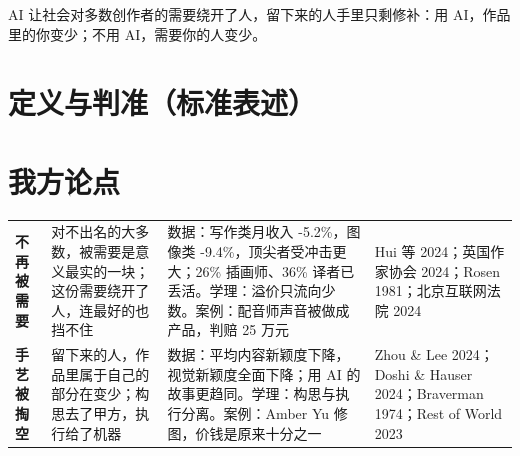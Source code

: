 \documentclass[quick,con]{debate}
\begin{document}
\debatetitle
\begin{thesisbox}AI 让社会对多数创作者的需要绕开了人，留下来的人手里只剩修补：用 AI，作品里的你变少；不用 AI，需要你的人变少。\end{thesisbox}

\section{定义与判准（标准表述）}
\begin{fields}
\end{fields}

\section{我方论点}
\begin{tabularx}{\linewidth}{@{}L{5em}Y Y L{6.4em}@{}}\toprule
{}&&&\\\midrule
\textbf{不再被需要}&对不出名的大多数，被需要是意义最实的一块；这份需要绕开了人，连最好的也挡不住&数据：写作类月收入 -5.2\%，图像类 -9.4\%，顶尖者受冲击更大；26\% 插画师、36\% 译者已丢活。学理：溢价只流向少数。案例：配音师声音被做成产品，判赔 25 万元&Hui 等 2024；英国作家协会 2024；Rosen 1981；北京互联网法院 2024\\
\textbf{手艺被掏空}&留下来的人，作品里属于自己的部分在变少；构思去了甲方，执行给了机器&数据：平均内容新颖度下降，视觉新颖度全面下降；用 AI 的故事更趋同。学理：构思与执行分离。案例：Amber Yu 修图，价钱是原来十分之一&Zhou \& Lee 2024；Doshi \& Hauser 2024；Braverman 1974；Rest of World 2023\\
\bottomrule\end{tabularx}
\end{document}
